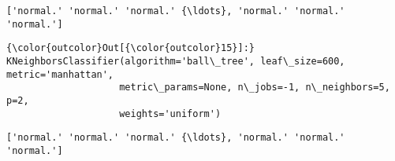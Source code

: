 \documentclass[11pt]{article}
\begin{document}
    \begin{Verbatim}[commandchars=\\\{\}]
['normal.' 'normal.' 'normal.' {\ldots}, 'normal.' 'normal.' 'normal.']

    \end{Verbatim}

\begin{Verbatim}[commandchars=\\\{\}]
{\color{outcolor}Out[{\color{outcolor}15}]:} KNeighborsClassifier(algorithm='ball\_tree', leaf\_size=600, metric='manhattan',
                    metric\_params=None, n\_jobs=-1, n\_neighbors=5, p=2,
                    weights='uniform')
\end{Verbatim}
            
    \begin{Verbatim}[commandchars=\\\{\}]
['normal.' 'normal.' 'normal.' {\ldots}, 'normal.' 'normal.' 'normal.']

    \end{Verbatim}
\end{document}
